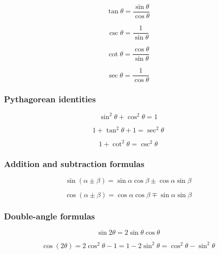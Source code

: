\begin{equation}
	\tan \theta = \frac{\sin\theta}{\cos \theta}
\end{equation}

\begin{equation} 
	\csc \theta = \frac{1}{\sin \theta}
\end{equation}

\begin{equation} 
	\cot \theta = \frac{\cos \theta}{\sin \theta}
\end{equation}

\begin{equation} 
	\sec \theta = \frac{1}{\cos \theta}
\end{equation}

\subsubsection{Pythagorean identities}

\begin{equation}
	\sin^2 \theta + \cos^2 \theta = 1
\end{equation}

\begin{equation}
	1 + \tan^2 \theta + 1 = \sec^2 \theta
\end{equation}

\begin{equation}
	1 + \cot^2 \theta = \csc^2 \theta
\end{equation}

\subsubsection{Addition and subtraction formulas}
\begin{equation} 
	\sin(\alpha \pm \beta) = \sin \alpha \cos \beta \pm \cos \alpha \sin \beta
\end{equation}

\begin{equation} 
	\cos(\alpha \pm \beta) = \cos \alpha \cos \beta \mp \sin \alpha \sin \beta
\end{equation}

\subsubsection{Double-angle formulas}
\begin{equation}
	\sin 2\theta = 2 \sin \theta \cos \theta
\end{equation}

\begin{equation} 
	\cos (2\theta) = 2\cos^2 \theta -1 =1-2\sin^2 \theta = \cos ^2 \theta - \sin^2 \theta
\end{equation}